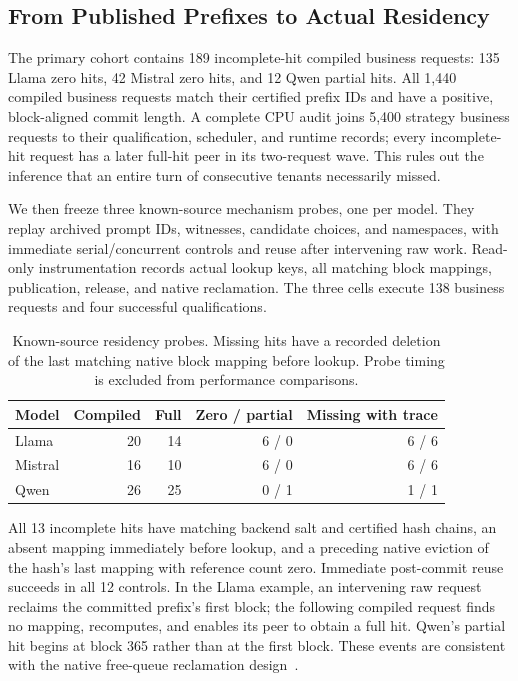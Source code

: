 \subsection{From Published Prefixes to Actual Residency}
\label{sec:residency}
The primary cohort contains 189 incomplete-hit compiled business requests: 135 Llama zero hits, 42 Mistral zero hits, and 12 Qwen partial hits. All 1,440 compiled business requests match their certified prefix IDs and have a positive, block-aligned commit length. A complete CPU audit joins 5,400 strategy business requests to their qualification, scheduler, and runtime records; every incomplete-hit request has a later full-hit peer in its two-request wave. This rules out the inference that an entire turn of consecutive tenants necessarily missed.

We then freeze three known-source mechanism probes, one per model. They replay archived prompt IDs, witnesses, candidate choices, and namespaces, with immediate serial/concurrent controls and reuse after intervening raw work. Read-only instrumentation records actual lookup keys, all matching block mappings, publication, release, and native reclamation. The three cells execute 138 business requests and four successful qualifications.

\begin{table}[t]
\centering\small
\caption{Known-source residency probes. Missing hits have a recorded deletion of the last matching native block mapping before lookup. Probe timing is excluded from performance comparisons.}
\label{tab:residency}
\begin{tabular}{@{}lrrrr@{}}
\toprule
Model & Compiled & Full & Zero / partial & Missing with trace\\
\midrule
Llama & 20 & 14 & 6 / 0 & 6 / 6\\
Mistral & 16 & 10 & 6 / 0 & 6 / 6\\
Qwen & 26 & 25 & 0 / 1 & 1 / 1\\
\bottomrule
\end{tabular}
\end{table}

All 13 incomplete hits have matching backend salt and certified hash chains, an absent mapping immediately before lookup, and a preceding native eviction of the hash's last mapping with reference count zero. Immediate post-commit reuse succeeds in all 12 controls. In the Llama example, an intervening raw request reclaims the committed prefix's first block; the following compiled request finds no mapping, recomputes, and enables its peer to obtain a full hit. Qwen's partial hit begins at block 365 rather than at the first block. These events are consistent with the native free-queue reclamation design~\cite{vllmAPC}.

